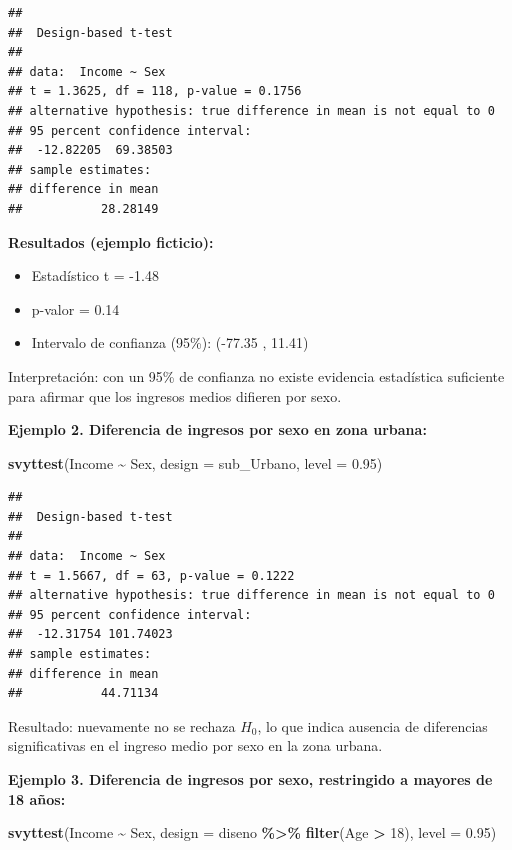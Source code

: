 \documentclass[
  spanish,
  12pt,
]{book}
\newenvironment{Shaded}{\begin{snugshade}}{\end{snugshade}}
\newcommand{\AttributeTok}[1]{\textcolor[rgb]{0.13,0.29,0.53}{#1}}
\newcommand{\DecValTok}[1]{\textcolor[rgb]{0.00,0.00,0.81}{#1}}
\newcommand{\FloatTok}[1]{\textcolor[rgb]{0.00,0.00,0.81}{#1}}
\newcommand{\FunctionTok}[1]{\textcolor[rgb]{0.13,0.29,0.53}{\textbf{#1}}}
\newcommand{\NormalTok}[1]{#1}
\newcommand{\SpecialCharTok}[1]{\textcolor[rgb]{0.81,0.36,0.00}{\textbf{#1}}}
\providecommand{\tightlist}{%
  \setlength{\itemsep}{0pt}\setlength{\parskip}{0pt}}
\begin{document}
\begin{verbatim}
## 
##  Design-based t-test
## 
## data:  Income ~ Sex
## t = 1.3625, df = 118, p-value = 0.1756
## alternative hypothesis: true difference in mean is not equal to 0
## 95 percent confidence interval:
##  -12.82205  69.38503
## sample estimates:
## difference in mean 
##           28.28149
\end{verbatim}

\textbf{Resultados (ejemplo ficticio):}

\begin{itemize}
\tightlist
\item
  Estadístico t = -1.48
\item
  p-valor = 0.14
\item
  Intervalo de confianza (95\%): (-77.35 , 11.41)
\end{itemize}

Interpretación: con un 95\% de confianza no existe evidencia estadística suficiente para afirmar que los ingresos medios difieren por sexo.

\textbf{Ejemplo 2. Diferencia de ingresos por sexo en zona urbana:}

\begin{Shaded}
\begin{Highlighting}[]
\FunctionTok{svyttest}\NormalTok{(Income }\SpecialCharTok{\textasciitilde{}}\NormalTok{ Sex, }\AttributeTok{design =}\NormalTok{ sub\_Urbano, }\AttributeTok{level =} \FloatTok{0.95}\NormalTok{)}
\end{Highlighting}
\end{Shaded}

\begin{verbatim}
## 
##  Design-based t-test
## 
## data:  Income ~ Sex
## t = 1.5667, df = 63, p-value = 0.1222
## alternative hypothesis: true difference in mean is not equal to 0
## 95 percent confidence interval:
##  -12.31754 101.74023
## sample estimates:
## difference in mean 
##           44.71134
\end{verbatim}

Resultado: nuevamente no se rechaza \(H_0\), lo que indica ausencia de diferencias significativas en el ingreso medio por sexo en la zona urbana.

\textbf{Ejemplo 3. Diferencia de ingresos por sexo, restringido a mayores de 18 años:}

\begin{Shaded}
\begin{Highlighting}[]
\FunctionTok{svyttest}\NormalTok{(Income }\SpecialCharTok{\textasciitilde{}}\NormalTok{ Sex,}
         \AttributeTok{design =}\NormalTok{ diseno }\SpecialCharTok{\%\textgreater{}\%} \FunctionTok{filter}\NormalTok{(Age }\SpecialCharTok{\textgreater{}} \DecValTok{18}\NormalTok{),}
         \AttributeTok{level =} \FloatTok{0.95}\NormalTok{)}
\end{Highlighting}
\end{Shaded}
\end{document}

